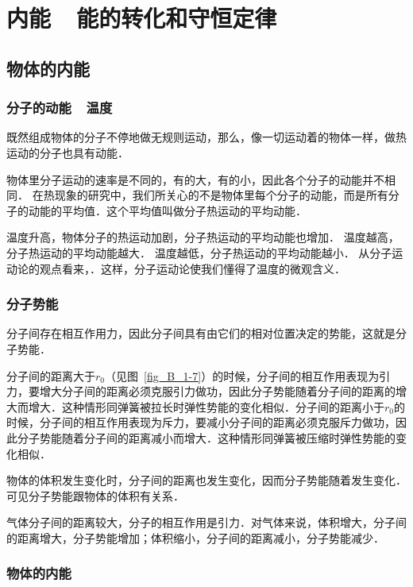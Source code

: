 \chapter{内能~~能的转化和守恒定律}\label{chapter-internal-energy-and-laws-of-conversion-and-conservation-of-sssenergy}


\section{物体的内能}
\subsection{分子的动能~~温度}
既然组成物体的分子不停地做无规则运动，那么，像一切运动着的物体一样，做热运动的分子也具有动能．

物体里分子运动的速率是不同的，有的大，有的小，因此各个分子的动能并不相同．
在热现象的研究中，我们所关心的不是物体里每个分子的动能，而是所有分子的动能的平均值．这个平均值叫做分子热运动的平均动能．

温度升高，物体分子的热运动加剧，分子热运动的平均动能也增加．
温度越高，分子热运动的平均动能越大．
温度越低，分子热运动的平均动能越小．
从分子运动论的观点看来，．这样，分子运动论使我们懂得了温度的微观含义．

\subsection{分子势能} 

分子间存在相互作用力，因此分子间具有由它们的相对位置决定的势能，这就是分子势能．

分子间的距离大于$r_0$（见图~\ref{fig_B_1-7}）的时候，分子间的相互作用表现为引力，要增大分子间的距离必须克服引力做功，因此分子势能随着分子间的距离的增大而增大．这种情形同弹簧被拉长时弹性势能的变化相似．分子间的距离小于$r_0$的
时候，分子间的相互作用表现为斥力，要减小分子间的距离必须克服斥力做功，因此分子势能随着分子间的距离减小而增大．这种情形同弹簧被压缩时弹性势能的变化相似．

物体的体积发生变化时，分子间的距离也发生变化，因而分子势能随着发生变化．可见分子势能跟物体的体积有关系．

气体分子间的距离较大，分子的相互作用是引力．对气体来说，体积增大，分子间的距离增大，分子势能增加；体积缩小，分子间的距离减小，分子势能减少．

\subsection{物体的内能} 

